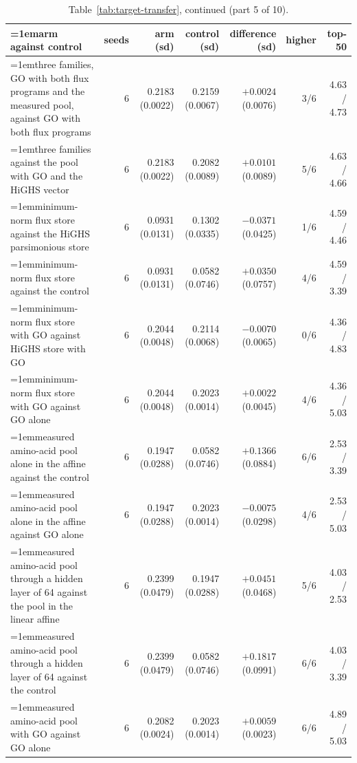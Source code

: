 \begin{table}[H]
  \centering
  \footnotesize
  \setlength{\tabcolsep}{2.5pt}
  \caption[The rounds on betaxanthin: arm against control, continued]{Table~\ref{tab:target-transfer}, continued (part 5 of 10).}
  \label{tab:target-transfer-5}
  \begin{tabular}{@{}>{\raggedright\hangindent=1em\hangafter=1\arraybackslash}p{78.5mm}rrrrrr@{}}
    \hline
    arm against control & seeds & arm (sd) & control (sd) & difference (sd) & higher & top-50 \\
    \hline
    three families, GO with both flux programs and the measured pool, against GO with both flux programs & 6 & 0.2183 (0.0022) & 0.2159 (0.0067) & $+0.0024$ (0.0076) & 3/6 & 4.63 / 4.73 \\
    three families against the pool with GO and the HiGHS vector & 6 & 0.2183 (0.0022) & 0.2082 (0.0089) & $+0.0101$ (0.0089) & 5/6 & 4.63 / 4.66 \\
    minimum-norm flux store against the HiGHS parsimonious store & 6 & 0.0931 (0.0131) & 0.1302 (0.0335) & $-0.0371$ (0.0425) & 1/6 & 4.59 / 4.46 \\
    minimum-norm flux store against the control & 6 & 0.0931 (0.0131) & 0.0582 (0.0746) & $+0.0350$ (0.0757) & 4/6 & 4.59 / 3.39 \\
    minimum-norm flux store with GO against HiGHS store with GO & 6 & 0.2044 (0.0048) & 0.2114 (0.0068) & $-0.0070$ (0.0065) & 0/6 & 4.36 / 4.83 \\
    minimum-norm flux store with GO against GO alone & 6 & 0.2044 (0.0048) & 0.2023 (0.0014) & $+0.0022$ (0.0045) & 4/6 & 4.36 / 5.03 \\
    measured amino-acid pool alone in the affine against the control & 6 & 0.1947 (0.0288) & 0.0582 (0.0746) & $+0.1366$ (0.0884) & 6/6 & 2.53 / 3.39 \\
    measured amino-acid pool alone in the affine against GO alone & 6 & 0.1947 (0.0288) & 0.2023 (0.0014) & $-0.0075$ (0.0298) & 4/6 & 2.53 / 5.03 \\
    measured amino-acid pool through a hidden layer of 64 against the pool in the linear affine & 6 & 0.2399 (0.0479) & 0.1947 (0.0288) & $+0.0451$ (0.0468) & 5/6 & 4.03 / 2.53 \\
    measured amino-acid pool through a hidden layer of 64 against the control & 6 & 0.2399 (0.0479) & 0.0582 (0.0746) & $+0.1817$ (0.0991) & 6/6 & 4.03 / 3.39 \\
    measured amino-acid pool with GO against GO alone & 6 & 0.2082 (0.0024) & 0.2023 (0.0014) & $+0.0059$ (0.0023) & 6/6 & 4.89 / 5.03 \\

\end{tabular}
\end{table}
